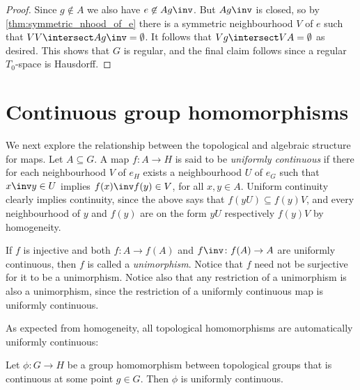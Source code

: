 \documentclass[article, a4paper, 11pt, oneside]{memoir}
\numberwithin{equation}{chapter}
\begin{document}
\begin{proof}
    Since $g \not\in A$ we also have $e \not\in Ag\inv$. But $Ag\inv$ is closed, so by \cref{thm:symmetric_nhood_of_e} there is a symmetric neighbourhood $V$ of $e$ such that $VV \intersect Ag\inv = \emptyset$. It follows that $Vg \intersect VA = \emptyset$ as desired. This shows that $G$ is regular, and the final claim follows since a regular $T_0$-space is Hausdorff.
\end{proof}


\section{Continuous group homomorphisms}


We next explore the relationship between the topological and algebraic structure for maps. Let $A \subseteq G$. A map $f \colon A \to H$ is said to be \emph{uniformly continuous} if there for each neighbourhood $V$ of $e_H$ exists a neighbourhood $U$ of $e_G$ such that $x\inv y \in U$ implies $f(x)\inv f(y) \in V$, for all $x,y \in A$. Uniform continuity clearly implies continuity, since the above says that $f(yU) \subseteq f(y)V$, and every neighbourhood of $y$ and $f(y)$ are on the form $yU$ respectively $f(y)V$ by homogeneity.

If $f$ is injective and both $f \colon A \to f(A)$ and $f\inv \colon f(A) \to A$ are uniformly continuous, then $f$ is called a \emph{unimorphism}. Notice that $f$ need not be surjective for it to be a unimorphism. Notice also that any restriction of a unimorphism is also a unimorphism, since the restriction of a uniformly continuous map is uniformly continuous.

As expected from homogeneity, all topological homomorphisms are automatically uniformly continuous:

\begin{proposition}
    \label{thm:group-homomorphism-continuity}
    Let $\phi \colon G \to H$ be a group homomorphism between topological groups that is continuous at some point $g \in G$. Then $\phi$ is uniformly continuous.
\end{proposition}
\end{document}
